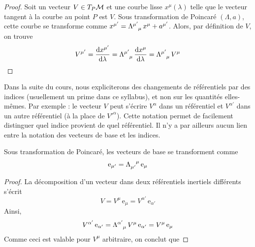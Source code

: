 {\begin{theoremframe}
\begin{propri}
\end{propri}
\end{theoremframe}
\begin{proof}
    Soit un vecteur $V \in T_P\mathcal{M}$ et une courbe lisse $x^\mu(\lambda)$ telle que le vecteur tangent à la courbe au point $P$ est $V$. Sous transformation de Poincaré $(\Lambda,a)$, cette courbe se transforme comme $x^{\mu'} = \Lambda\indices{^{\mu'}_{\mu}} \, x^\mu + a^{\mu'}$. Alors, par définition de $V$, on trouve
    \begin{align}
        V^{\mu'} = \frac{\td x^{\mu'}}{\td \lambda} = \Lambda\indices{^{\mu'}_{\mu}} \, \frac{\td x^{\mu}}{\td \lambda} = \Lambda\indices{^{\mu'}_{\mu}}\, V^\mu
    \end{align}
\end{proof}
\begin{notat}
    Dans la suite du cours, nous expliciterons des changements de référentiels par des indices (usuellement un prime dans ce syllabus), et non sur les quantités elles-mêmes. Par exemple : le vecteur $V$ peut s'écrire $V^\alpha$ dans un référentiel et $V^{\alpha'}$ dans un autre référentiel (à la place de $V'^{\alpha}$). Cette notation permet de facilement distinguer quel indice provient de quel référentiel. Il n'y a par ailleurs aucun lien entre la notation des vecteurs de base et les indices.
\end{notat}
\begin{theoremframe}
    \begin{propri}
        Sous transformation de Poincaré, les vecteurs de base se transforment comme
        \begin{equation}
            \mathrm{e}_{\mu'} = \Lambda\indices{_{\mu'}^{\mu}}\, \mathrm{e}_{\mu}
        \end{equation}
    \end{propri}
\end{theoremframe}
\begin{proof}
    La décomposition d'un vecteur dans deux référentiels inertiels différents s'écrit
    \begin{equation*}
        V = V^{\mu} \, \mathrm{e}_{\mu} = V^{\alpha'} \,\mathrm{e}_{\alpha'}
    \end{equation*}
    Ainsi,
    \begin{equation*}
        V^{\alpha'}\, \mathrm{e}_{\alpha'} = \Lambda\indices{^{\alpha'}_{\mu}} \, V^\mu \,\mathrm{e}_{\alpha'} = V^\mu \,\mathrm{e}_{\mu}
    \end{equation*}
    Comme ceci est valable pour $V^\mu$ arbitraire, on conclut que 

\end{proof}}
